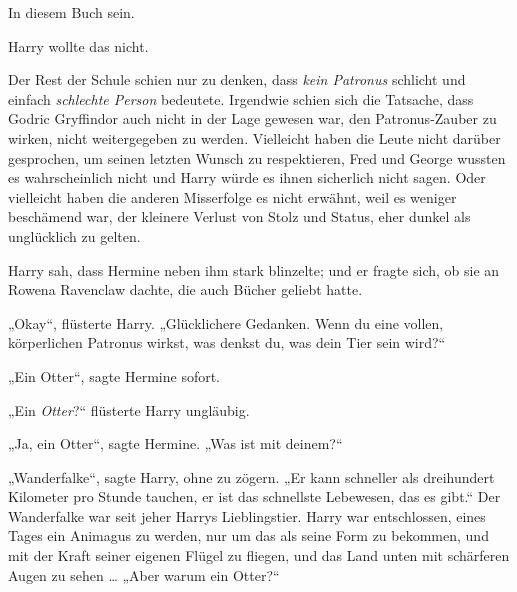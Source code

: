 In diesem Buch sein.

Harry wollte das nicht.

Der Rest der Schule schien nur zu denken, dass \emph{kein Patronus} schlicht und einfach \emph{schlechte Person} bedeutete. Irgendwie schien sich die Tatsache, dass Godric Gryffindor auch nicht in der Lage gewesen war, den Patronus-Zauber zu wirken, nicht weitergegeben zu werden. Vielleicht haben die Leute nicht darüber gesprochen, um seinen letzten Wunsch zu respektieren, Fred und George wussten es wahrscheinlich nicht und Harry würde es ihnen sicherlich nicht sagen. Oder vielleicht haben die anderen Misserfolge es nicht erwähnt, weil es weniger beschämend war, der kleinere Verlust von Stolz und Status, eher dunkel als unglücklich zu gelten.

Harry sah, dass Hermine neben ihm stark blinzelte; und er fragte sich, ob sie an Rowena Ravenclaw dachte, die auch Bücher geliebt hatte.

„Okay“, flüsterte Harry.
„Glücklichere Gedanken. Wenn du eine vollen, körperlichen Patronus wirkst, was denkst du, was dein Tier sein wird?“

„Ein Otter“, sagte Hermine sofort.

„Ein \emph{Otter}?“ flüsterte Harry ungläubig.

„Ja, ein Otter“, sagte Hermine.
„Was ist mit deinem?“

„Wanderfalke“, sagte Harry, ohne zu zögern.
„Er kann schneller als dreihundert Kilometer pro Stunde tauchen, er ist das schnellste Lebewesen, das es gibt.“ Der Wanderfalke war seit jeher Harrys Lieblingstier. Harry war entschlossen, eines Tages ein Animagus zu werden, nur um das als seine Form zu bekommen, und mit der Kraft seiner eigenen Flügel zu fliegen, und das Land unten mit schärferen Augen zu sehen …
„Aber warum ein Otter?“


